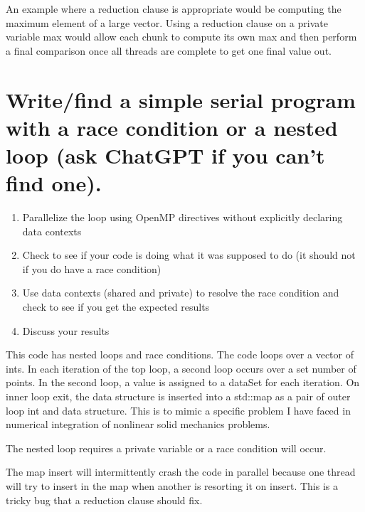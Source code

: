 \documentclass[11pt]{article}
\begin{document}
An example where a reduction clause is appropriate would be computing
the maximum element of a large vector. Using a reduction clause on a
private variable max would allow each chunk to compute its own max and
then perform a final comparison once all threads are complete to get
one final value out.

\section{Write/find a simple serial program with a race condition or a nested loop (ask ChatGPT if you can’t find one).}
\label{sec:orge5fb4c7}
\begin{enumerate}
\item Parallelize the loop using OpenMP directives without explicitly declaring data contexts
\item Check to see if your code is doing what it was supposed to do (it should not if you do have a race condition)
\item Use data contexts (shared and private) to resolve the race condition and check to see if you get the expected results
\item Discuss your results
\end{enumerate}

This code has nested loops and race conditions. The code loops over a
vector of ints. In each iteration of the top loop, a second loop
occurs over a set number of points. In the second loop, a value
is assigned to a dataSet for each iteration. On inner loop exit, the data
structure is inserted into a std::map as a pair of outer loop int and
data structure. This is to mimic a specific problem I have faced in
numerical integration of nonlinear solid mechanics problems.

The nested loop requires a private variable or a race condition will
occur.

The map insert will intermittently crash the code in parallel because
one thread will try to insert in the map when another is resorting it
on insert. This is a tricky bug that a reduction clause should fix.
\end{document}
